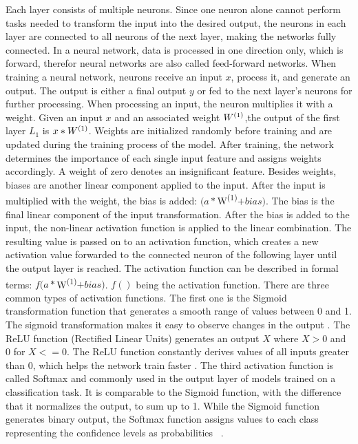Each layer consists of multiple neurons. Since one neuron alone cannot perform tasks needed to transform the input into the desired output, the neurons in each layer are connected to all neurons of the next layer, making the networks fully connected. In a neural network, data is processed in one direction only, which is forward, therefor neural networks are also called feed-forward networks. When training a neural network, neurons receive an input $x$, process it, and generate an output. The output is either a final output $y$ or fed to the next layer's neurons for further processing. When processing an input, the neuron multiplies it with a weight. Given an input $x$ and an associated weight $W\textsuperscript{(1)}$,the output of the first layer $L_1$ is $x*W\textsuperscript{(1)}$. Weights are initialized randomly before training and are updated during the training process of the model. After training, the network determines the importance of each single input feature and assigns weights accordingly. A weight of zero denotes an insignificant feature. Besides weights, biases are another linear component applied to the input. After the input is multiplied with the weight, the bias is added: $(a*$W\textsuperscript{(1)}$+bias)$. 
The bias is the final linear component of the input transformation. After the bias is added to the input, the non-linear activation function is applied to the linear combination. 
The resulting value is passed on to an activation function, which creates a new activation value forwarded to the connected neuron of the following layer until the output layer is reached. The activation function can be described in formal terms: 
$f(a*$W\textsuperscript{(1)}$+bias)$.  $f()$ being the activation function.
There are three common types of activation functions. The first one is the Sigmoid transformation function that generates a smooth range of values between 0 and 1. The sigmoid transformation makes it easy to observe changes in the output \cite{han1995influence}. The ReLU function (Rectified Linear Units) generates an output $X$ where $X>0$ and 0 for $X<= 0$. The ReLU function constantly derives values of all inputs greater than 0, which helps the network train faster \cite{glorot2011deep}. 
The third activation function is called Softmax and commonly used in the output layer of models trained on a classification task. It is comparable to the Sigmoid function, with the difference that it normalizes the output, to sum up to 1. While the Sigmoid function generates binary output, the Softmax function assigns values to each class representing the confidence levels as probabilities ~\protect\cite{jang2016categorical}.

